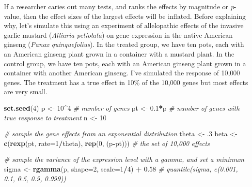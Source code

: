 \documentclass[]{book}
\newenvironment{Shaded}{\begin{snugshade}}{\end{snugshade}}
\newcommand{\CommentTok}[1]{\textcolor[rgb]{0.56,0.35,0.01}{\textit{#1}}}
\newcommand{\DataTypeTok}[1]{\textcolor[rgb]{0.13,0.29,0.53}{#1}}
\newcommand{\DecValTok}[1]{\textcolor[rgb]{0.00,0.00,0.81}{#1}}
\newcommand{\FloatTok}[1]{\textcolor[rgb]{0.00,0.00,0.81}{#1}}
\newcommand{\KeywordTok}[1]{\textcolor[rgb]{0.13,0.29,0.53}{\textbf{#1}}}
\newcommand{\NormalTok}[1]{#1}
\newcommand{\OperatorTok}[1]{\textcolor[rgb]{0.81,0.36,0.00}{\textbf{#1}}}
\newcommand{\StringTok}[1]{\textcolor[rgb]{0.31,0.60,0.02}{#1}}
\begin{document}
If a researcher caries out many tests, and ranks the effects by magnitude or \emph{p}-value, then the effect sizes of the largest effects will be inflated. Before explaining why, let's simulate this using an experiment of allelopathic effects of the invasive garlic mustard (\emph{Alliaria petiolata}) on gene expression in the native American ginseng (\emph{Panax quinquefolius}). In the treated group, we have ten pots, each with an American ginseng plant grown in a container with a mustard plant. In the control group, we have ten pots, each with an American ginseng plant grown in a container with another American ginseng. I've simulated the response of 10,000 genes. The treatment has a true effect in 10\% of the 10,000 genes but most effects are very small.

\begin{Shaded}
\begin{Highlighting}[]
\KeywordTok{set.seed}\NormalTok{(}\DecValTok{4}\NormalTok{)}
\NormalTok{p <-}\StringTok{ }\DecValTok{10}\OperatorTok{^}\DecValTok{4} \CommentTok{# number of genes}
\NormalTok{pt <-}\StringTok{ }\FloatTok{0.1}\OperatorTok{*}\NormalTok{p }\CommentTok{# number of genes with true response to treatment}
\NormalTok{n <-}\StringTok{ }\DecValTok{10}

\CommentTok{# sample the gene effects from an exponential distribution}
\NormalTok{theta <-}\StringTok{ }\FloatTok{.3}
\NormalTok{beta <-}\StringTok{ }\KeywordTok{c}\NormalTok{(}\KeywordTok{rexp}\NormalTok{(pt, }\DataTypeTok{rate=}\DecValTok{1}\OperatorTok{/}\NormalTok{theta),}
          \KeywordTok{rep}\NormalTok{(}\DecValTok{0}\NormalTok{, (p}\OperatorTok{-}\NormalTok{pt))) }\CommentTok{# the set of 10,000 effects}

\CommentTok{# sample the variance of the expression level with a gamma, and set a minimum}
\NormalTok{sigma <-}\StringTok{ }\KeywordTok{rgamma}\NormalTok{(p, }\DataTypeTok{shape=}\DecValTok{2}\NormalTok{, }\DataTypeTok{scale=}\DecValTok{1}\OperatorTok{/}\DecValTok{4}\NormalTok{) }\OperatorTok{+}\StringTok{ }\FloatTok{0.58}
\CommentTok{# quantile(sigma, c(0.001, 0.1, 0.5, 0.9, 0.999))}


\end{Highlighting}
\end{Shaded}
\end{document}
